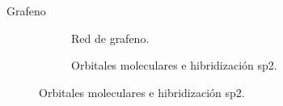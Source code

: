 \documentclass[aspectratio=169]{beamer}
\begin{document}
	\begin{frame}{Grafeno}
		\begin{figure}
			\begin{subfigure}[b]{0.4\textwidth}
				\caption{Red de grafeno.}
			\end{subfigure}\hfill
			\begin{subfigure}[b]{0.5\textwidth}
				\caption{Orbitales moleculares e hibridización sp2.}
			\end{subfigure}
		\end{figure}
	\end{frame}
\end{document}
